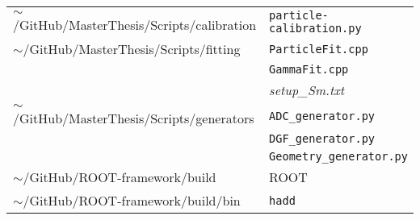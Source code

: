 \begin{tabular}{ll}
    $\sim$/GitHub/MasterThesis/Scripts/calibration         & \texttt{particle-calibration.py}        \\
    $\sim$/GitHub/MasterThesis/Scripts/fitting             & \texttt{ParticleFit.cpp}                \\
                                                           & \texttt{GammaFit.cpp}                   \\
                                                           & \textit{setup\_Sm.txt}                  \\
    $\sim$/GitHub/MasterThesis/Scripts/generators          & \texttt{ADC\_generator.py}              \\
                                                           & \texttt{DGF\_generator.py}              \\
                                                           & \texttt{Geometry\_generator.py}         \\
    $\sim$/GitHub/ROOT-framework/build                     & ROOT                                    \\
    $\sim$/GitHub/ROOT-framework/build/bin                 & \texttt{hadd}                           \\
    \hline
\end{tabular}